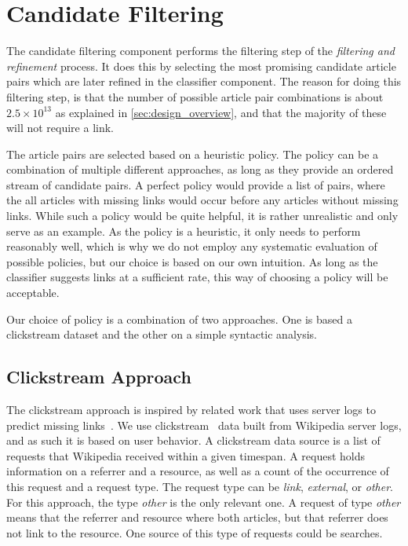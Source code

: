 \section{Candidate Filtering}
The candidate filtering component performs the filtering step of the \emph{filtering and refinement} process. It does this by selecting the most promising candidate article pairs which are later refined in the classifier component. The reason for doing this filtering step, is that the number of possible article pair combinations is about $2.5 \times 10^{13}$ as explained in \cref{sec:design_overview}, and that the majority of these will not require a link.

The article pairs are selected based on a heuristic policy. The policy can be a combination of multiple different approaches, as long as they provide an ordered stream of candidate pairs. A perfect policy would provide a list of pairs, where the all articles with missing links would occur before any articles without missing links. While such a policy would be quite helpful, it is rather unrealistic and only serve as an example. As the policy is a heuristic, it only needs to perform reasonably well, which is why we do not employ any systematic evaluation of possible policies, but our choice is based on our own intuition. As long as the classifier suggests links at a sufficient rate, this way of choosing a policy will be acceptable.

Our choice of policy is a combination of two approaches. One is based a clickstream dataset and the other on a simple syntactic analysis.

\subsection{Clickstream Approach}

The clickstream approach is inspired by related work that uses server logs to predict missing links~\cite{hyperlink-structure-using-logs}. We use clickstream~\cite{wiki-clickstream} data built from Wikipedia server logs, and as such it is based on user behavior. A clickstream data source is a list of requests that Wikipedia received within a given timespan. A request holds information on a referrer and a resource, as well as a count of the occurrence of this request and a request type. The request type can be \emph{link}, \emph{external}, or \emph{other}. For this approach, the type \emph{other} is the only relevant one. A request of type \emph{other} means that the referrer and resource where both articles, but that referrer does not link to the resource. One source of this type of requests could be searches.

